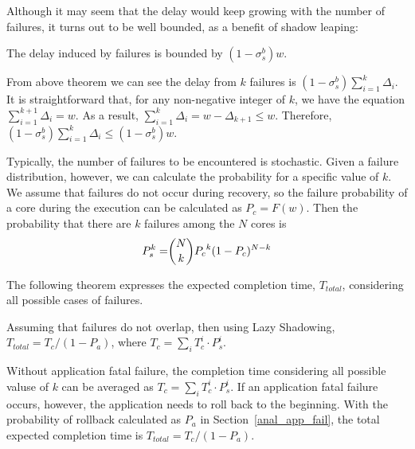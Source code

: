 Although it may seem that the delay would keep growing with the number of failures, 
it turns out to be well bounded, as a benefit of shadow leaping: 

\begin{corollary}
The delay induced by failures is bounded by $(1-\sigma_s^b)w$.
\end{corollary}
\begin{IEEEproof}
From above theorem we can see the delay from $k$ failures is $(1-\sigma_s^b)\sum_{i=1}^k\Delta_i$. It is straightforward that, for any non-negative integer of $k$, we have the equation $\sum_{i=1}^{k+1}\Delta_i= w$. As a result, 
$\sum_{i=1}^{k}\Delta_i = w - \Delta_{k+1} \le w$. Therefore, $(1-\sigma_s^b)\sum_{i=1}^k\Delta_i \le (1-\sigma_s^b)w$.
\end{IEEEproof}

Typically, the number of failures to be encountered is stochastic. Given a failure distribution, however, we can calculate the probability for a specific value of $k$. We assume that failures do not occur during recovery, so the failure probability of a core during the execution can be calculated as $P_c = F(w)$. Then the probability that there are $k$ failures among the $N$ cores is 
\begin{equation}
\begin{split}
P_s^{k}= & \dbinom{N}{k}{P_c}^k(1-P_c)^{N-k} \\
\end{split}
\end{equation}

The following theorem expresses the expected completion time, $T_{total}$, considering all possible cases of failures. 

\begin{theorem}
Assuming that failures do not overlap, then using Lazy Shadowing,
$T_{total} = T_{c} / (1 - P_a)$, where $T_{c} = \sum_{i} T_{c}^{i} \cdot P_s^{i}$.
\end{theorem}
\begin{IEEEproof}
Without application fatal failure, the completion time considering all possible valuse of $k$ can be averaged as $T_{c} = \sum_{i} T_{c}^{i} \cdot P_s^{i}$. If an application fatal failure occurs, however, the application needs to roll back to the beginning. With the probability of rollback calculated as $P_a$ in Section~\ref{anal_app_fail}, the total expected completion time is $T_{total} = T_{c} / (1 - P_a)$.
\end{IEEEproof}

